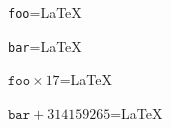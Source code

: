 \documentclass{article}
\begin{document}
{\texttt{foo}}=\thefoo\LaTeX

{\texttt{bar}}=\thebar\LaTeX

${\texttt{foo}}\times 17$=\thefoo\LaTeX

${\texttt{bar}}+314159265$=\thebar\LaTeX
\end{document}

